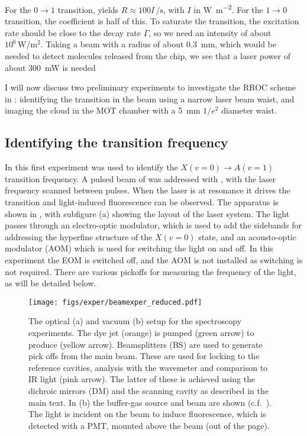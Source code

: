For the $0\rightarrow1$ transition, 
yields $R \approx 100 I\,\si{\per\second}$, with $I$ in
\si{\watt\per\meter\squared}. For the $1\rightarrow0$ transition, the
coefficient is half of this. To saturate the transition, the excitation rate
should be close to the decay rate $\Gamma$, so we need an intensity of about
$10^6\,\si{\watt\per\meter\squared}$. Taking a beam with a radius of about
\SI{0.3}{\milli\meter}, which would be needed to detect molecules released from
the chip, we see that a laser power of about \SI{300}{\milli\watt} is needed

I will now discuss two preliminary experiments to investigate the RROC scheme
in \CaF{}: identifying the transition in the \CaF{} beam using a narrow laser
beam waist, and imaging the \CaF{} cloud in the MOT chamber with a
\SI{5}{\milli\meter} $1/e^2$ diameter waist.

\subsection{Identifying the transition frequency}

In this first experiment  was used to identify the $X(v=0)
\rightarrow A(v=1)$ transition frequency. A pulsed beam of \CaF{} was addressed
with , with the laser frequency scanned between pulses.  When the
laser is at resonance it drives the transition and light-induced fluorescence
can be observed. The apparatus is shown in , with
subfigure (a) showing the layout of the  laser system. The
light passes through an electro-optic modulator, which is used
to add the sidebands for addressing the hyperfine structure of the $X(v=0)$
state, and an acousto-optic modulator (AOM) which is used for switching the
light on and off. In this experiment the EOM is switched off, and the AOM is
not installed as switching is not required. There are various pickoffs for
measuring the frequency of the light, as will be detailed below.

\begin{figure}
  \centering
  \texttt{[image: figs/exper/beamexper\_reduced.pdf]}
  \caption[Optical and vacuum setup for RROC spectroscopy experiment]{
    The optical (a) and vacuum (b) setup for the spectroscopy
    experiments. The dye jet (orange) is pumped (green
    arrow) to produce  (yellow arrow). Beamsplitters (BS) are used
    to generate pick offs from the main beam. These are used for locking to the
    reference cavities, analysis with the wavemeter and comparison to IR light
    (pink arrow). The latter of these is achieved using the dichroic mirrors
    (DM) and  the scanning cavity as described in the main text. In (b) the
    buffer-gas source and \CaF{} beam are shown
    (c.f.~). The  light is
    incident on the beam to induce fluorescence, which is detected with a PMT,
    mounted above the beam (out of the page).
  }
  \label{exper:fig:beamapp} 
\end{figure}

